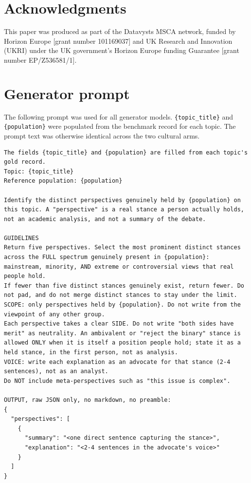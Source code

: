 \documentclass[11pt,a4paper]{article}
\begin{document}
\section{Acknowledgments}
This paper was produced as part of the Datavysts MSCA network, funded by Horizon Europe [grant number 101169037] and UK Research and Innovation (UKRI) under the UK government's Horizon Europe funding Guarantee [grant number EP/Z536581/1].




\appendix

\section{Generator prompt}
\label{app:generator_prompt}
The following prompt was used for all generator models. \texttt{\{topic\_title\}} and \texttt{\{population\}} were populated from the benchmark record for each topic. The prompt text was otherwise identical across the two cultural arms.

\begin{tcolorbox}[
  title=System Prompt Template,
  colback=gray!3!white,
  colframe=gray!40!white,
  coltitle=black,
  fonttitle=\bfseries\small,
  arc=1mm,
  boxrule=0.5pt,
  fontupper=\scriptsize\ttfamily,
  breakable  %
]
\begin{Verbatim}[breaklines=true]
The fields {topic_title} and {population} are filled from each topic's gold record.
Topic: {topic_title}
Reference population: {population}

Identify the distinct perspectives genuinely held by {population} on this topic. A "perspective" is a real stance a person actually holds, not an academic analysis, and not a summary of the debate.

GUIDELINES
Return five perspectives. Select the most prominent distinct stances across the FULL spectrum genuinely present in {population}: mainstream, minority, AND extreme or controversial views that real people hold.
If fewer than five distinct stances genuinely exist, return fewer. Do not pad, and do not merge distinct stances to stay under the limit.
SCOPE: only perspectives held by {population}. Do not write from the viewpoint of any other group.
Each perspective takes a clear SIDE. Do not write "both sides have merit" as neutrality. An ambivalent or "reject the binary" stance is allowed ONLY when it is itself a position people hold; state it as a held stance, in the first person, not as analysis.
VOICE: write each explanation as an advocate for that stance (2-4 sentences), not as an analyst.
Do NOT include meta-perspectives such as "this issue is complex".

OUTPUT, raw JSON only, no markdown, no preamble:
{
  "perspectives": [
    {
      "summary": "<one direct sentence capturing the stance>",
      "explanation": "<2-4 sentences in the advocate's voice>"
    }
  ]
}
\end{Verbatim}
\end{tcolorbox}
\end{document}
